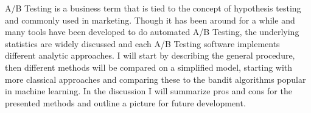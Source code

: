 \documentclass[main.tex]{subfiles}
\begin{document}
A/B Testing is a business term that is tied to the concept of hypothesis testing and commonly used in marketing. Though it has been around for a while and many tools have been developed to do automated A/B Testing, the underlying statistics are widely discussed and each A/B Testing software implements different analytic approaches. I will start by describing the general procedure, then different methods will be compared on a simplified model, starting with more classical approaches and comparing these to the bandit algorithms popular in machine learning. In the discussion I will summarize pros and cons for the presented methods and outline a picture for future development.
\end{document}
